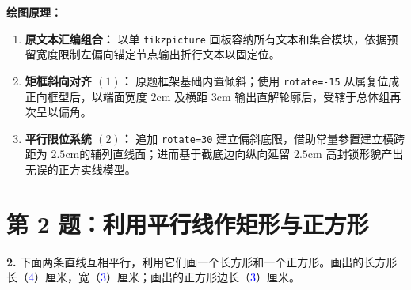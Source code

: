\begin{center}
\end{center}

\vspace{0.5cm}
\textbf{绘图原理：}
\begin{enumerate}
    \item \textbf{原文本汇编组合：} 以单 \texttt{tikzpicture} 画板容纳所有文本和集合模块，依据预留宽度限制左偏向锚定节点输出折行文本以固定位。
    \item \textbf{矩框斜向对齐 $(1)$：} 原题框架基础内置倾斜；使用 \texttt{rotate=-15} 从属复位成正向框型后，以端面宽度 $2\text{cm}$ 及横距 $3\text{cm}$ 输出直解轮廓后，受辖于总体组再次呈以偏角。
    \item \textbf{平行限位系统 $(2)$：} 追加 \texttt{rotate=30} 建立偏斜底限，借助常量参置建立横跨距为 $2.5\text{cm}$的辅列直线面；进而基于截底边向纵向延留 $2.5\text{cm}$ 高封锁形貌产出无误的正方实线模型。
\end{enumerate}

\vspace{1.5cm}

\section*{第 2 题：利用平行线作矩形与正方形}

\textbf{2.} 下面两条直线互相平行，利用它们画一个长方形和一个正方形。画出的长方形长（\;\textcolor{blue}{4}\;）厘米，宽（\;\textcolor{blue}{3}\;）厘米；画出的正方形边长（\;\textcolor{blue}{3}\;）厘米。


